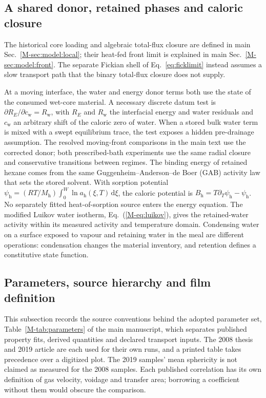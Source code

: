 \documentclass[11pt]{article}
\newcommand{\Bh}{B_{\mathrm{h}}}
\newcommand{\dd}{\mathrm{d}}
\begin{document}
\subsection{A shared donor, retained phases and caloric closure}
\label{sup:donor}\label{sup:binding}\label{sup:stefanrecovery}\label{sup:singlecomponent}
The historical core loading and algebraic total-flux closure are defined
in main Sec.~\ref*{M-sec:model:local}; their heat-fed front limit is
explained in main Sec.~\ref*{M-sec:model:front}. The separate Fickian shell
of Eq.~\eqref{eq:ficklimit} instead assumes a slow transport path that
the binary total-flux closure does not supply.

At a moving interface, the water and energy donor terms both use the state of the consumed wet-core material. A necessary discrete datum test is $\partial R_E/\partial c_{\mathrm w}=R_{\mathrm w}$, with $R_E$ and $R_{\mathrm w}$ the interfacial energy and water residuals and $c_{\mathrm w}$ an arbitrary shift of the caloric zero of water. When a stored bulk water term is mixed with a swept equilibrium trace, the test exposes a hidden pre-drainage assumption. The resolved moving-front comparisons in the main text use the corrected donor; both prescribed-bath experiments use the same radial closure and conservative transitions between regimes. The binding energy of retained hexane comes from the same Guggenheim--Anderson--de Boer (GAB) activity law that sets the stored solvent. With sorption potential $\psi_{\mathrm h}=(RT/M_{\mathrm h})\int_0^W\ln a_{\mathrm h}(\xi,T)\,\dd\xi$, the caloric potential is $\Bh=T\partial_T\psi_{\mathrm h}-\psi_{\mathrm h}$. No separately fitted heat-of-sorption source enters the energy equation. The modified Luikov water isotherm, Eq.~(\ref*{M-eq:luikov}), gives the retained-water activity within its measured activity and temperature domain. Condensing water on a surface exposed to vapour and retaining water in the meal are different operations: condensation changes the material inventory, and retention defines a constitutive state function.

\subsection{Parameters, source hierarchy and film definition}
\label{sup:parameters}\label{sup:luikov}\label{sup:oilmap}\label{sup:virial}\label{sup:filmconvention}
This subsection records the source conventions behind the adopted parameter
set, Table~\ref*{M-tab:parameters} of the main manuscript, which separates
published property fits, derived quantities and declared transport inputs.
The 2008 thesis and 2019 article are each used for their own runs, and a
printed table takes precedence over a digitized plot. The 2019 samples' mean
sphericity is not claimed as measured for the 2008 samples. Each published
correlation has its own definition of gas velocity, voidage and transfer
area; borrowing a coefficient without them would obscure the comparison.
\end{document}
